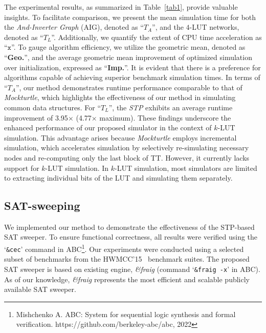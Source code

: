 \documentclass[conference]{IEEEtran}
\begin{document}

The experimental results, as summarized in Table~\ref{tab1}, provide valuable insights. 
To facilitate comparison, we present the mean simulation time for both the \emph{And-Inverter Graph} (AIG), denoted as ``$T_A$'', and the $4$-LUT networks, denoted as ``$T_L$''. 
Additionally, we quantify the extent of CPU time acceleration as ``$\texttt{x}$''.
To gauge algorithm efficiency, we utilize the geometric mean, denoted as ``{\bf Geo.}'', and the average geometric mean improvement of optimized simulation over initialization, expressed as ``{\bf Imp.}''. 
It is evident that there is a preference for algorithms capable of achieving superior benchmark simulation times.
In terms of ``$T_A$'', our method demonstrates runtime performance comparable to that of \emph{Mockturtle}, which highlights the effectiveness of our method in simulating common data structures.
For ``$T_L$'', the \emph{STP} exhibits an average runtime improvement of 3.95$\times$ (4.77$\times$ maximum). 
These findings underscore the enhanced performance of our proposed simulator in the context of $k$-LUT simulation.
This advantage arises because \emph{Mockturtle} employs incremental simulation, which accelerates simulation by selectively re-simulating necessary nodes and re-computing only the last block of TT. 
However, it currently lacks support for $k$-LUT simulation. 
In $k$-LUT simulation, most simulators are limited to extracting individual bits of the LUT and simulating them separately.

\subsection{SAT-sweeping}
\label{sec62}
We implemented our method to demonstrate the effectiveness of the STP-based SAT sweeper. 
To ensure functional correctness, all results were verified using the `\texttt{\&cec}' command in ABC\footnote{Mishchenko A. ABC: System for sequential logic synthesis and formal verification. https://github.com/berkeley-abc/abc, 2022}. 
Our experiments were conducted using a selected subset of benchmarks from the HWMCC'15~\cite{exp1} benchmark suites.
The proposed SAT sweeper is based on existing engine, \emph{\&fraig} (command `\texttt{\&fraig -x}' in ABC). 
As of our knowledge, \emph{\&fraig} represents the most efficient and scalable publicly available SAT sweeper.
\end{document}
